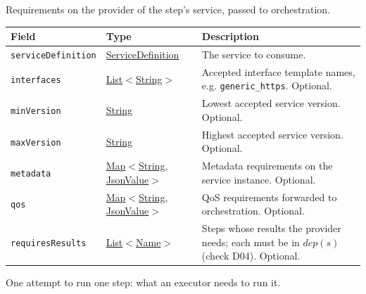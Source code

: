 \documentclass[a4paper]{arrowhead}
\newcommand{\pref}[1]{{\textcolor{ArrowheadGrey}{\hyperref[sec:model:primitives:#1]{#1}}}}
\begin{document}
Requirements on the provider of the step's service, passed to orchestration.

{\small
\begin{longtable}{|p{3.9cm}|p{4.4cm}|p{7.5cm}|}

\hline
\rowcolor{gray!33} Field & Type & Description \\ \hline
\endhead
\texttt{serviceDefinition} & \pref{ServiceDefinition} & The service to consume. \\ \hline
\texttt{interfaces} & \pref{List}$<$\pref{String}$>$ & Accepted interface template names, e.g. \texttt{generic\_https}. Optional. \\ \hline
\texttt{minVersion} & \pref{String} & Lowest accepted service version. Optional. \\ \hline
\texttt{maxVersion} & \pref{String} & Highest accepted service version. Optional. \\ \hline
\texttt{metadata} & \pref{Map}$<$\pref{String}, \pref{JsonValue}$>$ & Metadata requirements on the service instance. Optional. \\ \hline
\texttt{qos} & \pref{Map}$<$\pref{String}, \pref{JsonValue}$>$ & QoS requirements forwarded to orchestration. Optional. \\ \hline
\texttt{requiresResults} & \pref{List}$<$\pref{Name}$>$ & Steps whose results the provider needs; each must be in $dep(s)$ (check D04). Optional. \\ \hline
\end{longtable}
}

One attempt to run one step: what an executor needs to run it.
\end{document}
